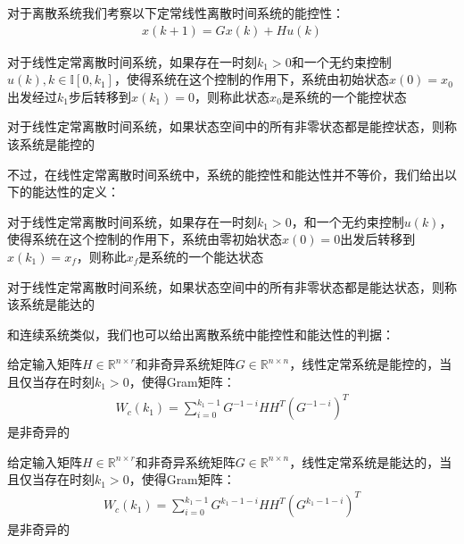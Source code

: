 对于离散系统我们考察以下定常线性离散时间系统的能控性：
\begin{gather*}
    x(k + 1) = G x(k) + H u(k)
\end{gather*}

\begin{definition}[能控状态]
    对于线性定常离散时间系统，如果存在一时刻$k_1 > 0$和一个无约束控制$u(k),k \in \mathbb{I}[0,k_1]$，使得系统在这个控制的作用下，系统由初始状态$x(0) = x_0$出发经过$k_1$步后转移到$x(k_1) = 0$，则称此状态$x_0$是系统的一个能控状态
\end{definition}

\begin{definition}[系统的能控性]
    对于线性定常离散时间系统，如果状态空间中的所有非零状态都是能控状态，则称该系统是能控的
\end{definition}

不过，在线性定常离散时间系统中，系统的能控性和能达性并不等价，我们给出以下的能达性的定义：
\begin{definition}[能达状态]
    对于线性定常离散时间系统，如果存在一时刻$k_1 > 0$，和一个无约束控制$u(k)$，使得系统在这个控制的作用下，系统由零初始状态$x(0) = 0$出发后转移到$x(k_1) = x_f$，则称此$x_f$是系统的一个能达状态
\end{definition}

\begin{definition}[系统能达性]
    对于线性定常离散时间系统，如果状态空间中的所有非零状态都是能达状态，则称该系统是能达的
\end{definition}

和连续系统类似，我们也可以给出离散系统中能控性和能达性的判据：

\begin{anymark}[能控性Gram判据]
    给定输入矩阵$H \in \mathbb{R}^{n \times r }$和非奇异系统矩阵$G \in \mathbb{R}^{n\times n}$，线性定常系统是能控的，当且仅当存在时刻$k_1 > 0$，使得Gram矩阵：
    \begin{gather*}
        W_c(k_1) = \sum_{i=0}^{k_1 - 1} G^{-1-i} H H^T (G^{-1-i})^T
    \end{gather*}
    是非奇异的
\end{anymark}

\begin{anymark}[能达性Gram判据]
    给定输入矩阵$H \in \mathbb{R}^{n \times r }$和非奇异系统矩阵$G \in \mathbb{R}^{n\times n}$，线性定常系统是能达的，当且仅当存在时刻$k_1 > 0$，使得Gram矩阵：
    \begin{gather*}
        W_c(k_1) = \sum_{i=0}^{k_1 -1} G^{k_1-1-i} H H^T (G^{k_1-1-i})^T
    \end{gather*}
    是非奇异的
\end{anymark}

